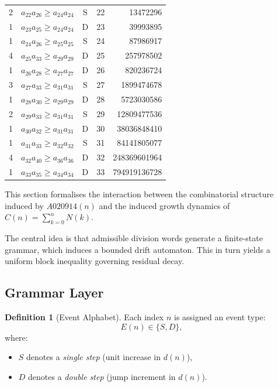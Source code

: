 \documentclass[12pt, oneside]{article}
\numberwithin{equation}{section}
\theoremstyle{definition}
\newtheorem{definition}{Definition}[section]
\theoremstyle{plain}
\theoremstyle{remark}
\begin{document}
\begin{table}[htbp]
\begin{tabular}{@{}rccrr@{}}
2 & $a_{22} a_{26} \ge a_{24} a_{24}$ & S & 22 &     13472296 \\
1 & $a_{23} a_{25} \ge a_{24} a_{24}$ & D & 23 &     39993895 \\
1 & $a_{24} a_{26} \ge a_{25} a_{25}$ & S & 24 &     87986917 \\
4 & $a_{25} a_{33} \ge a_{29} a_{29}$ & D & 25 &    257978502 \\
1 & $a_{26} a_{28} \ge a_{27} a_{27}$ & D & 26 &    820236724 \\
3 & $a_{27} a_{33} \ge a_{31} a_{31}$ & S & 27 &   1899474678 \\
1 & $a_{28} a_{30} \ge a_{29} a_{29}$ & D & 28 &   5723030586 \\
2 & $a_{29} a_{33} \ge a_{31} a_{31}$ & S & 29 &  12809477536 \\
1 & $a_{30} a_{32} \ge a_{31} a_{31}$ & D & 30 &  38036848410 \\
1 & $a_{31} a_{33} \ge a_{32} a_{32}$ & S & 31 &  84141805077 \\
4 & $a_{32} a_{40} \ge a_{36} a_{36}$ & D & 32 & 248369601964 \\
1 & $a_{33} a_{35} \ge a_{34} a_{34}$ & D & 33 & 794919136728 \\
\bottomrule
\end{tabular}
\end{table}

This section formalises the interaction between the combinatorial
structure induced by $A020914(n)$ and the induced growth dynamics
of $C(n) = \sum_{k=0}^n N(k)$.

The central idea is that admissible division words generate a
finite-state grammar, which induces a bounded drift automaton.
This in turn yields a uniform block inequality governing residual decay.

\subsection{Grammar Layer}

\begin{definition}[Event Alphabet]
Each index $n$ is assigned an event type:
\[
E(n) \in \{S, D\},
\]
where:
\begin{itemize}
\item $S$ denotes a \emph{single step} (unit increase in $d(n)$),
\item $D$ denotes a \emph{double step} (jump increment in $d(n)$).
\end{itemize}
\end{definition}
\end{document}
